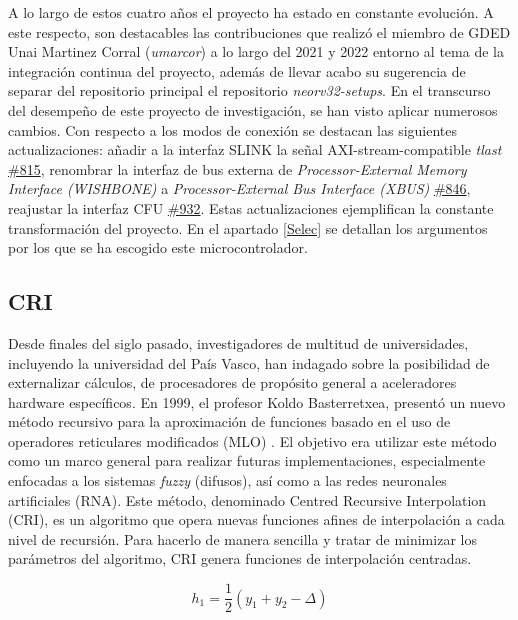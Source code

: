 A lo largo de estos cuatro años el proyecto ha estado en constante evolución.
A este respecto, son destacables las contribuciones que realizó el miembro de GDED Unai Martinez Corral (\textit{umarcor}) a lo largo del 2021 y 2022 entorno al tema de la integración continua del proyecto, además de llevar acabo su sugerencia de separar del repositorio principal el repositorio \textit{neorv32-setups}.
En el transcurso del desempeño de este proyecto de investigación, se han visto aplicar numerosos cambios.
Con respecto a los modos de conexión se destacan las siguientes actualizaciones:
añadir a la interfaz SLINK la señal AXI-stream-compatible \textit{tlast} \href{https://github.com/stnolting/neorv32/pull/815}{\#815}, renombrar la interfaz de bus externa de \textit{Processor-External Memory Interface (WISHBONE)} a \textit{Processor-External Bus Interface (XBUS)} \href{https://github.com/stnolting/neorv32/pull/846}{\#846}, reajustar la interfaz CFU \href{https://github.com/stnolting/neorv32/pull/932}{\#932}.
Estas actualizaciones ejemplifican la constante transformación del proyecto. 
En el apartado \ref{Selec} se detallan los argumentos por los que se ha escogido este microcontrolador.

\subsection{CRI}

Desde finales del siglo pasado, investigadores de multitud de universidades, incluyendo la universidad del País Vasco, han indagado sobre la posibilidad de externalizar cálculos, de procesadores de propósito general a aceleradores hardware específicos.
En 1999, el profesor Koldo Basterretxea, presentó un nuevo método recursivo para la aproximación de funciones basado en el uso de operadores reticulares modificados (MLO) \cite{basterretxea1999pwl} \cite{tarela2002optimised}.
El objetivo era utilizar este método como un marco general para realizar futuras implementaciones, especialmente enfocadas a los sistemas \textit{fuzzy} (difusos), así como a las redes neuronales artificiales (RNA).
Este método, denominado Centred Recursive Interpolation (CRI), es un algoritmo que opera nuevas funciones afines de interpolación a cada nivel de recursión.
Para hacerlo de manera sencilla y tratar de minimizar los parámetros del algoritmo, CRI genera funciones de interpolación centradas.

\begin{equation}\label{ec:1}
h_{1} = \frac{1}{2} (y_{1} + y_{2} - \Delta)\tag{*}
\end{equation}

